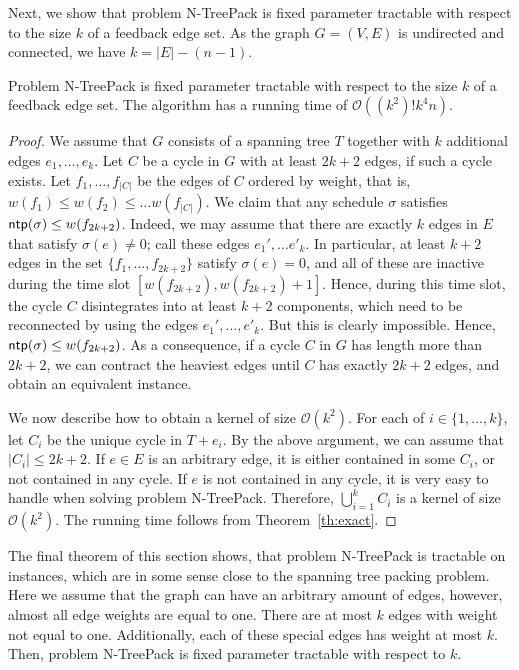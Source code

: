\documentclass[runningheads]{llncs}
\newcommand{\set}[1]{\{ #1 \}}
\newcommand{\fromto}[2]{\set{#1, \ldots, #2}}
\newcommand{\bigO}{\mathcal{O}}
\DeclareMathOperator{\ntp}{\text{\sf ntp}}
\newcommand{\xxxNTP}{{\sc N-TreePack}}
\begin{document}
Next, we show that problem {\xxxNTP} is fixed parameter tractable with respect to the size $k$ 
of a feedback edge set. 
As the graph $G=(V,E)$ is undirected and connected, we have $k=|E|-(n-1)$.

\begin{theorem}
\label{thm:FPT_feedback_edge_set}
Problem {\xxxNTP} is fixed parameter tractable with respect to the size $k$ of a feedback edge set. 
The algorithm has a running time of $\bigO((k^2)!k^4n)$. 
\end{theorem}

\begin{proof}
We assume that $G$ consists of a spanning tree $T$ together with $k$ additional edges $e_1,\ldots,e_k$. 
Let $C$ be a cycle in $G$ with at least $2k+2$ edges, if such a cycle exists. 
Let $f_1,\ldots,f_{|C|}$ be the edges of $C$ ordered by weight, that is, $w(f_1) \leq w(f_2) \leq \dots w(f_{|C|})$. 
We claim that any schedule $\sigma$ satisfies $\ntp(\sigma)\le w(f_{2k+2})$. 
Indeed, we may assume that there are exactly $k$ edges in $E$ that satisfy $\sigma(e)\ne0$; 
call these edges $e_1', \dots e'_k$. 
In particular, at least $k+2$ edges in the set $\fromto{f_1}{f_{2k+2}}$ satisfy $\sigma(e)=0$, 
and all of these are inactive during the time slot $[w(f_{2k+2}), w(f_{2k+2}) + 1]$. 
Hence, during this time slot, the cycle $C$ disintegrates into at least $k+2$ components, which need 
to be reconnected by using the edges $e_1', \dots, e'_k$. But this is clearly impossible. 
Hence, $\ntp(\sigma) \leq w(f_{2k+2})$. 
As a consequence, if a cycle $C$ in $G$ has length more than $2k+2$, we can contract the heaviest 
edges until $C$ has exactly $2k+2$ edges, and obtain an equivalent instance.

We now describe how to obtain a kernel of size $\bigO(k^2)$. For each of $i \in \fromto{1}{k}$, let $C_i$ be the unique cycle in $T + e_i$. By the above argument, we can assume that $|C_i| \leq 2k+2$. If $e \in E$ is an arbitrary edge, it is either contained in some $C_i$, or not contained in any cycle. If $e$ is not contained in any cycle, it is very easy to handle when solving problem {\xxxNTP}. Therefore, $\bigcup_{i=1}^k C_i$ is a kernel of size $\bigO(k^2)$. The running time follows from Theorem~\ref{th:exact}.
\end{proof}

The final theorem of this section shows, that problem {\xxxNTP} is tractable on instances, which are in some sense close to the spanning tree packing problem. Here we assume that the graph can have an arbitrary amount of edges, however, almost all edge weights are equal to one. There are at most $k$ edges with weight not equal to one. Additionally, each of these special edges has weight at most $k$. Then, problem {\xxxNTP} is fixed parameter tractable with respect to $k$.
\end{document}
